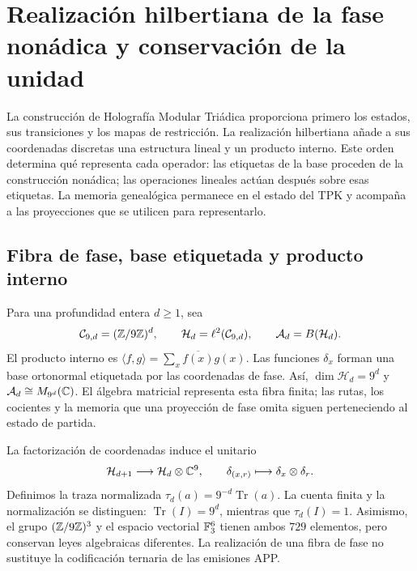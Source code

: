 \section{Realización hilbertiana de la fase nonádica y conservación de la unidad}
\label{iv:hilbert}

La construcción de Holografía Modular Triádica proporciona primero los
estados, sus transiciones y los mapas de restricción. La realización
hilbertiana añade a sus coordenadas discretas una estructura lineal y un
producto interno. Este orden determina qué representa cada operador:
las etiquetas de la base proceden de la construcción nonádica; las
operaciones lineales actúan después sobre esas etiquetas. La memoria
genealógica permanece en el estado del TPK y acompaña a las proyecciones
que se utilicen para representarlo.

\subsection{Fibra de fase, base etiquetada y producto interno}

Para una profundidad entera \(d\geq1\), sea
\begin{equation}
 \mathcal C_{9,d}=(\mathbb Z/9\mathbb Z)^d,
 \qquad \mathcal H_d=\ell^2(\mathcal C_{9,d}),
 \qquad \mathcal A_d=B(\mathcal H_d).
 \label{iv:eq:hilbert-finito}
\end{equation}
El producto interno es
\(\langle f,g\rangle=\sum_x\overline{f(x)}g(x)\). Las funciones
\(\delta_x\) forman una base ortonormal etiquetada por las coordenadas
de fase. Así, \(\dim\mathcal H_d=9^d\) y
\(\mathcal A_d\cong M_{9^d}(\mathbb C)\). El álgebra matricial representa
esta fibra finita; las rutas, los cocientes y la memoria que una
proyección de fase omita siguen perteneciendo al estado de partida.

La factorización de coordenadas induce el unitario
\begin{equation}
 \mathcal H_{d+1}\longrightarrow\mathcal H_d\otimes\mathbb C^9,
 \qquad \delta_{(x,r)}\longmapsto\delta_x\otimes\delta_r.
 \label{iv:eq:factorizacion-hilbert}
\end{equation}
Definimos la traza normalizada
\(\tau_d(a)=9^{-d}\operatorname{Tr}(a)\). La cuenta finita y la
normalización se distinguen: \(\operatorname{Tr}(I)=9^d\), mientras
que \(\tau_d(I)=1\). Asimismo, el grupo \((\mathbb Z/9\mathbb Z)^3\) y el
espacio vectorial \(\mathbb F_3^6\) tienen ambos \(729\) elementos, pero
conservan leyes algebraicas diferentes. La realización de una fibra de
fase no sustituye la codificación ternaria de las emisiones APP.

